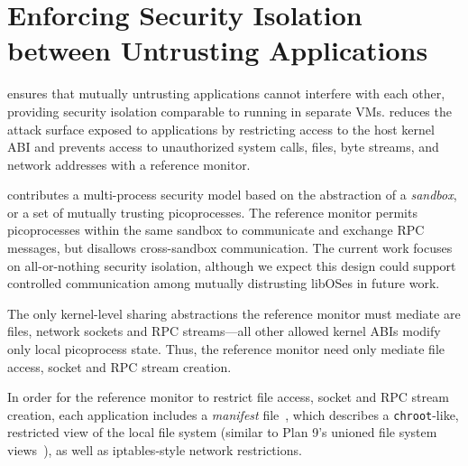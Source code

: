\section{Enforcing Security Isolation between Untrusting Applications}
\label{sec:graphene:security}

\sysname{} ensures that mutually untrusting applications 
cannot interfere with each other, providing security isolation
comparable to running in separate VMs.
\sysname{} reduces the attack surface exposed to applications
by restricting access to the host kernel ABI 
and prevents access to unauthorized system calls, files, byte streams,
and network addresses with a reference monitor.

\sysname{} contributes a multi-process security model 
based on the abstraction of a {\em sandbox},
or a set of mutually trusting picoprocesses.
The reference monitor permits picoprocesses within the same sandbox
to communicate and exchange RPC messages, but disallows cross-sandbox communication.
The current work focuses on all-or-nothing security isolation, although we expect
this design could support
controlled communication among mutually distrusting libOSes
in future work.


The only kernel-level sharing abstractions the reference monitor must mediate
are files, network sockets and RPC streams---all other allowed kernel ABIs
modify only local picoprocess state.
Thus, the reference monitor need only mediate file access, socket and RPC stream creation.


In order for the reference monitor to restrict file access, socket and RPC stream creation,
each application includes a {\em manifest} file~\citep{hunt07rethink},
which describes a {\tt chroot}-like, restricted view of the local 
file system (similar to Plan 9's unioned file system views~\citep{pike90plan9}),
as well as iptables-style network restrictions.


